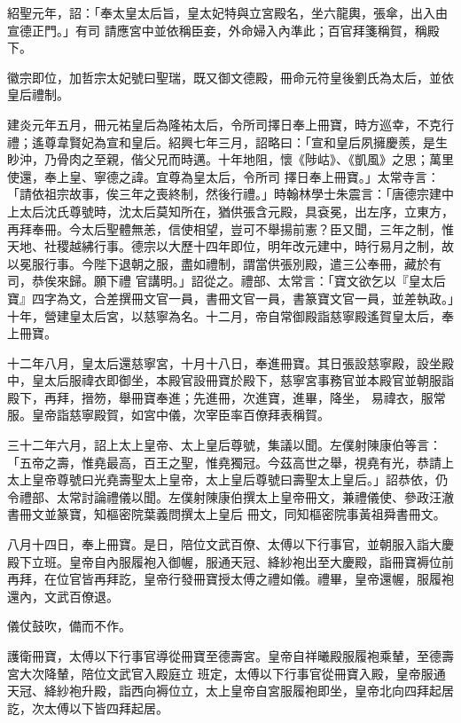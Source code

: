 \begin{pinyinscope}
 紹聖元年，詔：「奉太皇太后旨，皇太妃特與立宮殿名，坐六龍輿，張傘，出入由宣德正門。」有司
 請應宮中並依稱臣妾，外命婦入內準此；百官拜箋稱賀，稱殿下。



 徽宗即位，加哲宗太妃號曰聖瑞，既又御文德殿，冊命元符皇後劉氏為太后，並依皇后禮制。



 建炎元年五月，冊元祐皇后為隆祐太后，令所司擇日奉上冊寶，時方巡幸，不克行禮；遙尊韋賢妃為宣和皇后。紹興七年三月，詔略曰：「宣和皇后夙擁慶羨，是生眇沖，乃骨肉之至親，偕父兄而時邁。十年地阻，懷《陟岵》、《凱風》之思；萬里使還，奉上皇、寧德之諱。宜尊為皇太后，令所司
 擇日奉上冊寶。」太常寺言：「請依祖宗故事，俟三年之喪終制，然後行禮。」時翰林學士朱震言：「唐德宗建中上太后沈氏尊號時，沈太后莫知所在，猶供張含元殿，具袞冕，出左序，立東方，再拜奉冊。今太后聖體無恙，信使相望，豈可不舉揚前憲？臣又聞，三年之制，惟天地、社稷越紼行事。德宗以大歷十四年即位，明年改元建中，時行易月之制，故以冕服行事。今陛下退朝之服，盡如禮制，謂當供張別殿，遣三公奉冊，藏於有司，恭俟來歸。願下禮
 官講明。」詔從之。禮部、太常言：「寶文欲乞以『皇太后寶』四字為文，合差撰冊文官一員，書冊文官一員，書篆寶文官一員，並差執政。」十年，營建皇太后宮，以慈寧為名。十二月，帝自常御殿詣慈寧殿遙賀皇太后，奉上冊寶。



 十二年八月，皇太后還慈寧宮，十月十八日，奉進冊寶。其日張設慈寧殿，設坐殿中，皇太后服禕衣即御坐，本殿官設冊寶於殿下，慈寧宮事務官並本殿官並朝服詣殿下，再拜，搢笏，舉冊寶奉進；先進冊，次進寶，進畢，降坐，
 易禕衣，服常服。皇帝詣慈寧殿賀，如宮中儀，次宰臣率百僚拜表稱賀。



 三十二年六月，詔上太上皇帝、太上皇后尊號，集議以聞。左僕射陳康伯等言：「五帝之壽，惟堯最高，百王之聖，惟堯獨冠。今茲高世之舉，視堯有光，恭請上太上皇帝尊號曰光堯壽聖太上皇帝，太上皇后尊號曰壽聖太上皇后。」詔恭依，仍令禮部、太常討論禮儀以聞。左僕射陳康伯撰太上皇帝冊文，兼禮儀使、參政汪澈書冊文並篆寶，知樞密院葉義問撰太上皇后
 冊文，同知樞密院事黃祖舜書冊文。



 八月十四日，奉上冊寶。是日，陪位文武百僚、太傅以下行事官，並朝服入詣大慶殿下立班。皇帝自內服履袍入御幄，服通天冠、絳紗袍出至大慶殿，詣冊寶褥位前再拜，在位官皆再拜訖，皇帝行發冊寶授太傅之禮如儀。禮畢，皇帝還幄，服履袍還內，文武百僚退。



 儀仗鼓吹，備而不作。



 護衛冊寶，太傅以下行事官導從冊寶至德壽宮。皇帝自祥曦殿服履袍乘輦，至德壽宮大次降輦，陪位文武官入殿庭立
 班定，太傅以下行事官從冊寶入殿，皇帝服通天冠、絳紗袍升殿，詣西向褥位立，太上皇帝自宮服履袍即坐，皇帝北向四拜起居訖，次太傅以下皆四拜起居。




\end{pinyinscope}
